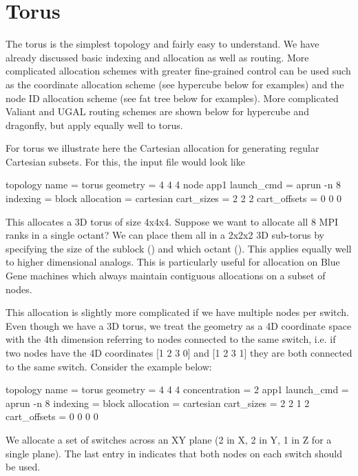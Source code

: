 \section{Torus}
\label{subsec:tutorial:hypercube}

The torus is the simplest topology and fairly easy to understand.
We have already discussed basic indexing and allocation as well as routing.
More complicated allocation schemes with greater fine-grained control can be used such as the
coordinate allocation scheme (see hypercube below for examples) and the node ID allocation scheme (see fat tree below for examples).
More complicated Valiant and UGAL routing schemes are shown below for hypercube and dragonfly,
but apply equally well to torus.

For torus we illustrate here the Cartesian allocation for generating regular Cartesian subsets.
For this, the input file would look like 

\begin{ViFile}
topology {
 name = torus
 geometry = 4 4 4
}
node {
 app1 {
  launch_cmd = aprun -n 8
  indexing = block
  allocation = cartesian
  cart_sizes = 2 2 2
  cart_offsets = 0 0 0
 }
}
\end{ViFile}

This allocates a 3D torus of size 4x4x4.
Suppose we want to allocate all 8 MPI ranks in a single octant?
We can place them all in a 2x2x2 3D sub-torus by specifying the size of the sublock 
() and which octant ().
This applies equally well to higher dimensional analogs.
This is particularly useful for allocation on Blue Gene machines
which always maintain contiguous allocations on a subset of nodes.

This allocation is slightly more complicated if we have multiple nodes per switch.
Even though we have a 3D torus, 
we treat the geometry as a 4D coordinate space with the 4th dimension referring to nodes connected to the same switch, 
i.e. if two nodes have the 4D coordinates [1 2 3 0] and [1 2 3 1] they are both connected to the same switch.
Consider the example below:

\begin{ViFile}
topology {
 name = torus
 geometry = 4 4 4
 concentration = 2
}
app1 {
 launch_cmd = aprun -n 8
 indexing = block
 allocation = cartesian
 cart_sizes = 2 2 1 2
 cart_offsets = 0 0 0 0
}
\end{ViFile}

We allocate a set of switches across an XY plane (2 in X, 2 in Y, 1 in Z for a single plane).
The last entry in  indicates that both nodes on each switch should be used.


